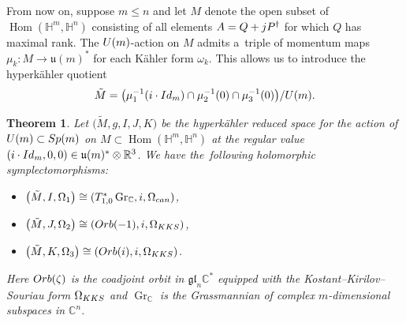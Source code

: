 \documentclass[11pt]{article}
\numberwithin{equation}{section}
\numberwithin{equation}{section}
\newtheorem{Theorem}{Theorem}[section]
\DeclareMathOperator{\Hom}{Hom}
\DeclareMathOperator{\Gr}{Gr}
\newcommand{\R}{\mathbb{R}}
\newcommand{\C}{\mathbb{C}}
\newcommand{\Q}{\mathbb{H}}
\newcommand{\Id}{{\rm Id}}
\begin{document}
From now on, suppose $m\le n$ and let $M$ denote the open subset of $\Hom(\Q^m,\Q^n)$ consisting of all elements $A=Q+{\rm j}P^\dagger$ for which $Q$ has maximal rank. The ${\rm U}(m)$-action on $M$ admits a~triple of momentum maps $\mu_k\colon M\rightarrow\mathfrak{u}(m)^*$ for each K\"{a}hler form $\omega_k$. This allows us to introduce the hyperk\"{a}hler quotient
\[
\tilde{M}=\bigl(\mu_1^{-1}({\rm i}\cdot\Id_m)\cap\mu_2^{-1}(0)\cap\mu_3^{-1}(0)\bigr)/{\rm U}(m).
\]
\begin{Theorem}\label{HK_red_thm}
	Let $\bigl(\tilde{M},g,I,J,K\bigr)$ be the hyperk\"{a}hler reduced space for the action of ${\rm U}(m)\subset {\rm Sp}(m)$ on $M\subset\Hom(\Q^m,\Q^n)$ at the regular value $({\rm i}\cdot\Id_m,0,0)\in\mathfrak{u}(m)^*\otimes\R^3$. We have the~following holomorphic symplectomorphisms:
	\begin{itemize}\itemsep=0pt
		\item $\bigl(\tilde{M}, I, \Omega_1\bigr)\cong (T^*_{1,0}\Gr_\C, {\rm i}, \Omega_{\rm can})$,
		\item $\bigl(\tilde{M},J,\Omega_2\bigr)\cong({\rm Orb}(-1), {\rm i}, \Omega_{\rm KKS})$,
		\item $\bigl(\tilde{M},K,\Omega_3\bigr)\cong({\rm Orb}({\rm i}), {\rm i}, \Omega_{\rm KKS})$.
	\end{itemize}
	Here ${\rm Orb}(\zeta)$ is the coadjoint orbit in $\mathfrak{gl}_n\C^*$ equipped with the Kostant--Kirilov--Souriau form $\Omega_{\rm KKS}$ and $\Gr_\C$ is the Grassmannian of complex $m$-dimensional subspaces in $\C^n$.
\end{Theorem}
\end{document}
